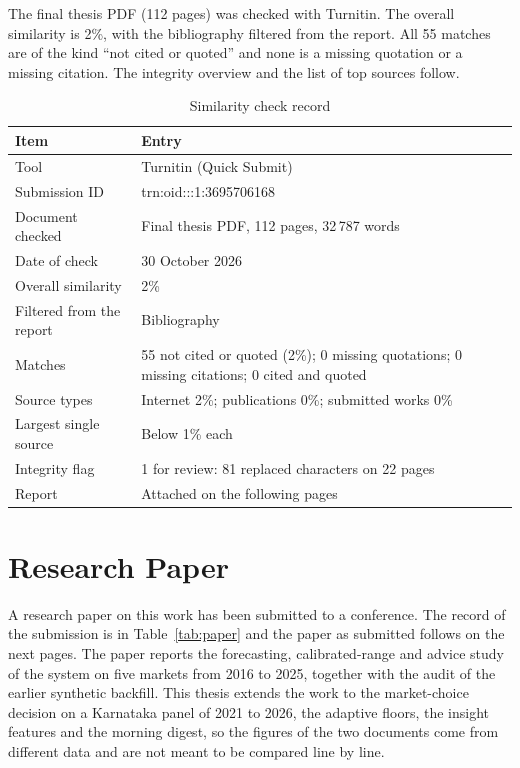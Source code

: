 \noindent The final thesis PDF (112 pages) was checked with Turnitin. The overall similarity is 2\%, with the bibliography filtered from the report. All 55 matches are of the kind ``not cited or quoted'' and none is a missing quotation or a missing citation. The integrity overview and the list of top sources follow.

\begin{table}[H]
\centering
\caption{Similarity check record}
\label{tab:similarity}
\small
\begin{tabular}{|l|p{9.2cm}|}
\hline
\textbf{Item} & \textbf{Entry} \\ \hline
Tool & Turnitin (Quick Submit) \\ \hline
Submission ID & trn:oid:::1:3695706168 \\ \hline
Document checked & Final thesis PDF, 112 pages, 32\,787 words \\ \hline
Date of check & 30 October 2026 \\ \hline
Overall similarity & 2\% \\ \hline
Filtered from the report & Bibliography \\ \hline
Matches & 55 not cited or quoted (2\%); 0 missing quotations; 0 missing citations; 0 cited and quoted \\ \hline
Source types & Internet 2\%; publications 0\%; submitted works 0\% \\ \hline
Largest single source & Below 1\% each \\ \hline
Integrity flag & 1 for review: 81 replaced characters on 22 pages \\ \hline
Report & Attached on the following pages \\ \hline
\end{tabular}
\end{table}


\chapter{Research Paper}
\label{appendix:paper}

\noindent A research paper on this work has been submitted to a conference. The record of the submission is in Table~\ref{tab:paper} and the paper as submitted follows on the next pages. The paper reports the forecasting, calibrated-range and advice study of the system on five markets from 2016 to 2025, together with the audit of the earlier synthetic backfill. This thesis extends the work to the market-choice decision on a Karnataka panel of 2021 to 2026, the adaptive floors, the insight features and the morning digest, so the figures of the two documents come from different data and are not meant to be compared line by line.

